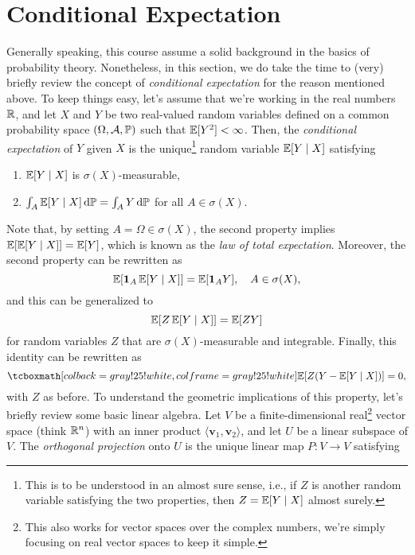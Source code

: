 \section{Conditional Expectation}

Generally speaking, this course assume a solid background in the basics of probability theory. Nonetheless, in this section, we do take the time to (very) briefly review the concept of \emph{conditional expectation} for the reason mentioned above. To keep things easy, let's assume that we're working in the real numbers $\R$, and let $X$ and $Y$ be two real-valued random variables defined on a common probability space $(\Omega, \mathcal{A}, \P)$ such that $\Exp[Y^2] < \infty$. Then, the \emph{conditional expectation} of $Y$ given $X$ is the unique\footnote{This is to be understood in an almost sure sense, i.e., if $Z$ is another random variable satisfying the two properties, then $Z = \Exp[Y \given X]$ almost surely.} random variable $\Exp[Y \given X]$ satisfying
\begin{enumerate}
    \item $\Exp[Y \given X]$ is $\sigma(X)$-measurable,
    
    \item $\int_A \Exp[Y \given X] \dP = \int_A Y \dP$ \quad for all $A \in \sigma(X)$.
\end{enumerate}
Note that, by setting $A = \Omega \in \sigma(X)$, the second property implies $\Exp[\Exp[Y \given X]] = \Exp[Y]$, which is known as the \emph{law of total expectation}. Moreover, the second property can be rewritten as
\[
    \Exp[\ind{A} \Exp[Y \given X]] = \Exp[\ind{A} Y], \quad A \in \sigma(X),
\]
and this can be generalized to
\[
    \Exp[Z \Exp[Y \given X]] = \Exp[ZY]
\]
for random variables $Z$ that are $\sigma(X)$-measurable and integrable. Finally, this identity can be rewritten as
\begin{equation}
    \label{eq: orthogonality of conditional expectation}
    \highlightMath{
        \Exp[Z (Y - \Exp[Y \given X])] = 0,
    }
\end{equation}
with $Z$ as before. To understand the geometric implications of this property, let's briefly review some basic linear algebra. Let $V$ be a finite-dimensional real\footnote{This also works for vector spaces over the complex numbers, we're simply focusing on real vector spaces to keep it simple.} vector space (think $\R^n$) with an inner product $\langle \mathbf{v}_1, \mathbf{v}_2 \rangle$, and let $U$ be a linear subspace of $V$. The \emph{orthogonal projection} onto $U$ is the unique linear map $P \colon V \to V$ satisfying
